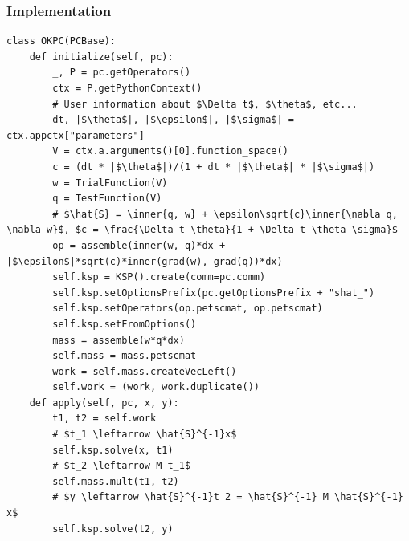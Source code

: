 \documentclass[presentation,aspectratio=43]{beamer}
\newcommand{\inner}[1]{\left\langle #1 \right \rangle}
\begin{document}
\begin{frame}[fragile]
  \frametitle{Implementation}
\begin{verbatim}
class OKPC(PCBase):
    def initialize(self, pc):
        _, P = pc.getOperators()
        ctx = P.getPythonContext()
        # User information about $\Delta t$, $\theta$, etc...
        dt, |$\theta$|, |$\epsilon$|, |$\sigma$| = ctx.appctx["parameters"]
        V = ctx.a.arguments()[0].function_space()
        c = (dt * |$\theta$|)/(1 + dt * |$\theta$| * |$\sigma$|)
        w = TrialFunction(V)
        q = TestFunction(V)
        # $\hat{S} = \inner{q, w} + \epsilon\sqrt{c}\inner{\nabla q, \nabla w}$, $c = \frac{\Delta t \theta}{1 + \Delta t \theta \sigma}$
        op = assemble(inner(w, q)*dx + |$\epsilon$|*sqrt(c)*inner(grad(w), grad(q))*dx)
        self.ksp = KSP().create(comm=pc.comm)
        self.ksp.setOptionsPrefix(pc.getOptionsPrefix + "shat_")
        self.ksp.setOperators(op.petscmat, op.petscmat)
        self.ksp.setFromOptions()
        mass = assemble(w*q*dx)
        self.mass = mass.petscmat
        work = self.mass.createVecLeft()
        self.work = (work, work.duplicate())
    def apply(self, pc, x, y):
        t1, t2 = self.work
        # $t_1 \leftarrow \hat{S}^{-1}x$
        self.ksp.solve(x, t1)
        # $t_2 \leftarrow M t_1$
        self.mass.mult(t1, t2)
        # $y \leftarrow \hat{S}^{-1}t_2 = \hat{S}^{-1} M \hat{S}^{-1} x$
        self.ksp.solve(t2, y)
\end{verbatim}
\end{frame}

\bgroup
{}
\end{document}
